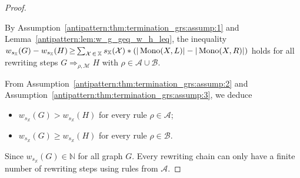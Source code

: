 \begin{proof} 
    \label{antipattern:proof:thm:termination_grs}
    
    By Assumption~\eqref{antipattern:thm:termination_grs:assump:1} and Lemma~\ref{antipattern:lem:w_g_geq_w_h_leq}, the inequality \(
        w_{s_\mathbb{X}}(G) - w_{s_\mathbb{X}}(H) 
        \mathop{\geq} 
        \sum_{\mathcal{X} \mathop{\in} \mathbb{X}}^{}s_\mathbb{X}(\mathcal{X}) * \left( 
            |\operatorname{Mono}(X,L)| -
            |\operatorname{Mono}(X,R)|
            \right)
    \) holds for all rewriting steps $G \mathop{\Rightarrow}_{\rho, \mathcal{M}} H$  with $\rho \mathop{\in} \mathcal{A} \mathop{\cup} \mathcal{B}$.
    
    \noindent From Assumption~\eqref{antipattern:thm:termination_grs:assump:2} and Assumption~\eqref{antipattern:thm:termination_grs:assump:3}, we deduce 
    \begin{itemize}
        \item \( w_{s_\mathbb{X}}(G) \mathop{>} w_{s_\mathbb{X}}(H) \) for every rule \(\rho \mathop{\in} \mathcal{A}\);
        \item  \( w_{s_\mathbb{X}}(G) \mathop{\geq} w_{s_\mathbb{X}}(H) \) for every rule \(\rho \mathop{\in} \mathcal{B}\).
    \end{itemize}
    Since $w_{s_\mathbb{X}}(G) \mathop{\in} \mathbb{N}$ for all graph $G$. Every rewriting chain can only have a finite number of rewriting steps using rules from $\mathcal{A}$.
\end{proof} 